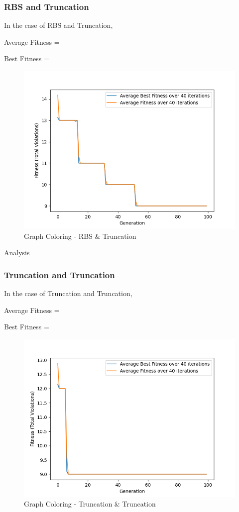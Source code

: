 \documentclass[11pt, letterpaper]{article}
\begin{document}
\subsubsection {RBS and Truncation}
In the case of RBS and Truncation,

Average Fitness = 

Best Fitness = 
\begin{figure}[h]
    \centering
    \includegraphics[scale = 0.6]{images/graphcoloring_rb_tr.png}
    \caption {Graph Coloring - RBS \& Truncation}
    \label {fig:gcBT}
\end{figure}

\underline{Analysis}

\subsubsection {Truncation and Truncation}
In the case of Truncation and Truncation,

Average Fitness = 

Best Fitness = 
\begin{figure}[H]
    \centering
    \includegraphics[scale = 0.6]{images/graphcoloring_tr_tr.png}
    \caption {Graph Coloring - Truncation \& Truncation}
    \label {fig:gcTT}
\end{figure}
\end{document}
